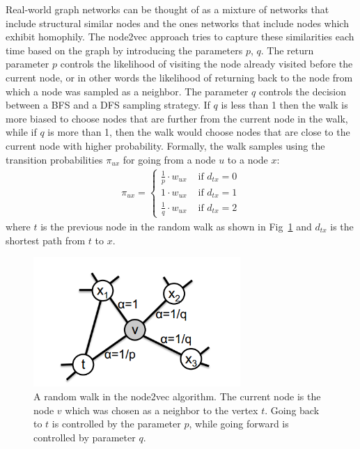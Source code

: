 Real-world graph networks can be thought of as a mixture of networks that 
include structural similar nodes and the ones networks that include nodes which 
exhibit homophily. The node2vec approach tries to capture these similarities each 
time based on the graph by introducing the parameters $p$, $q$. The return parameter $p$ controls the 
likelihood of visiting the node already visited before the current node, or in 
other words the likelihood of returning back to the node from which a node was 
sampled as a neighbor. The parameter $q$ controls the decision between a BFS and 
a DFS sampling strategy. If $q$ is less than 1 then the walk is more biased 
to choose nodes that are further from the current node in the walk, while if $q$ 
is more than 1, then the walk would choose nodes that are close to the current 
node with higher probability. Formally, the walk samples using the transition 
probabilities $\pi_{ux}$ for going from a node $u$ to a node $x$:
\begin{align}
\pi_{ux} = \begin{cases} \frac{1}{p}\cdot w_{ux} & \text{ if } d_{tx} = 0 \\
1\cdot w_{ux} & \text{ if } d_{tx} = 1 \\
\frac{1}{q}\cdot w_{ux} & \text{ if } d_{tx} = 2
\end{cases}
\end{align}
where $t$ is the previous node in the random walk as shown in 
Fig~\ref{node2vec_png} and $d_{tx}$ is the shortest path from $t$ to $x$. 
\begin{figure}
\begin{center}
\includegraphics[width=0.7\textwidth]{figures/node2vec.png}
\end{center}
\label{node2vec_png}
\caption{A random walk in the node2vec algorithm. The current node is the node 
$v$ which was chosen as a neighbor to the vertex $t$. 
Going back to $t$ is controlled by the parameter $p$, while going forward is 
controlled by parameter $q$.}
\end{figure}

